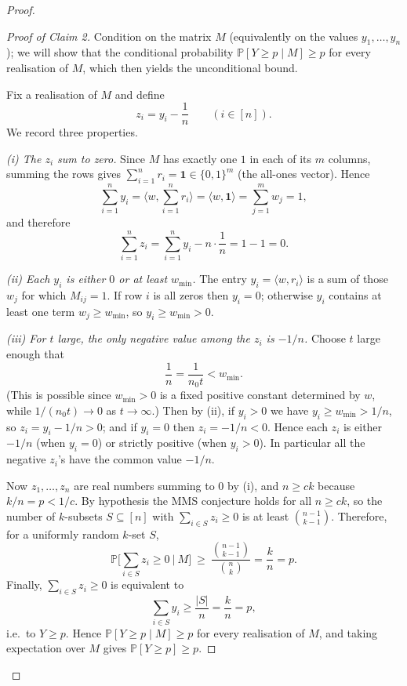 \begin{proof}
\begin{proof}[Proof of Claim 2]
Condition on the matrix $M$ (equivalently on the values $y_1,\dots,y_n$); we will show that the conditional probability $\mathbb P[Y\ge p\mid M]\ge p$ for every realisation of $M$, which then yields the unconditional bound.

Fix a realisation of $M$ and define
\[
z_i=y_i-\frac{1}{n}\qquad (i\in[n]).
\]
We record three properties.

\smallskip
\emph{(i) The $z_i$ sum to zero.} Since $M$ has exactly one $1$ in each of its $m$ columns, summing the rows gives $\sum_{i=1}^n r_i=\mathbf 1\in\{0,1\}^m$ (the all-ones vector). Hence
\[
\sum_{i=1}^n y_i=\Big\langle w,\sum_{i=1}^n r_i\Big\rangle=\langle w,\mathbf 1\rangle=\sum_{j=1}^m w_j=1,
\]
and therefore
\[
\sum_{i=1}^n z_i=\sum_{i=1}^n y_i-n\cdot\frac1n=1-1=0.
\]

\smallskip
\emph{(ii) Each $y_i$ is either $0$ or at least $w_{\min}$.} The entry $y_i=\langle w,r_i\rangle$ is a sum of those $w_j$ for which $M_{ij}=1$. If row $i$ is all zeros then $y_i=0$; otherwise $y_i$ contains at least one term $w_j\ge w_{\min}$, so $y_i\ge w_{\min}>0$.

\smallskip
\emph{(iii) For $t$ large, the only negative value among the $z_i$ is $-1/n$.} Choose $t$ large enough that
\[
\frac1n=\frac{1}{n_0 t}< w_{\min}.
\]
(This is possible since $w_{\min}>0$ is a fixed positive constant determined by $w$, while $1/(n_0 t)\to 0$ as $t\to\infty$.) Then by (ii), if $y_i>0$ we have $y_i\ge w_{\min}>1/n$, so $z_i=y_i-1/n>0$; and if $y_i=0$ then $z_i=-1/n<0$. Hence each $z_i$ is either $-1/n$ (when $y_i=0$) or strictly positive (when $y_i>0$). In particular all the negative $z_i$'s have the common value $-1/n$.

\smallskip
Now $z_1,\dots,z_n$ are real numbers summing to $0$ by (i), and $n\ge ck$ because $k/n=p<1/c$. By hypothesis the MMS conjecture holds for all $n\ge ck$, so the number of $k$-subsets $S\subseteq[n]$ with $\sum_{i\in S}z_i\ge 0$ is at least $\binom{n-1}{k-1}$. Therefore, for a uniformly random $k$-set $S$,
\[
\mathbb P\Big[\sum_{i\in S}z_i\ge 0\ \Big|\ M\Big]\ \ge\ \frac{\binom{n-1}{k-1}}{\binom{n}{k}}=\frac{k}{n}=p.
\]
Finally, $\sum_{i\in S}z_i\ge 0$ is equivalent to
\[
\sum_{i\in S}y_i\ge \frac{|S|}{n}=\frac{k}{n}=p,
\]
i.e.\ to $Y\ge p$. Hence $\mathbb P[Y\ge p\mid M]\ge p$ for every realisation of $M$, and taking expectation over $M$ gives $\mathbb P[Y\ge p]\ge p$.
\end{proof}


\end{proof}
